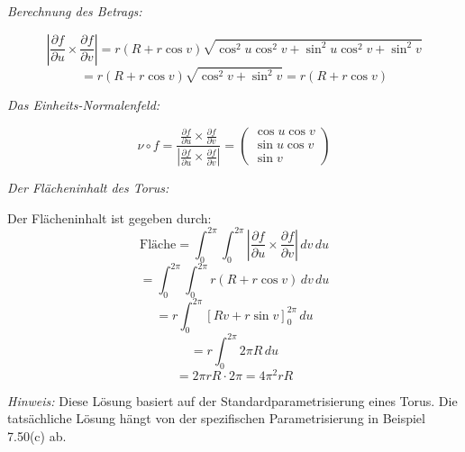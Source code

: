 \documentclass{article}
\newcommand{\del}{\partial}
\begin{document}
\textit{Berechnung des Betrags:}

$$\left|\frac{\del f}{\del u} \times \frac{\del f}{\del v}\right| = r(R + r\cos v)\sqrt{\cos^2 u \cos^2 v + \sin^2 u \cos^2 v + \sin^2 v}$$
$$= r(R + r\cos v)\sqrt{\cos^2 v + \sin^2 v} = r(R + r\cos v)$$

\textit{Das Einheits-Normalenfeld:}

$$\nu \circ f = \frac{\frac{\del f}{\del u} \times \frac{\del f}{\del v}}{\left|\frac{\del f}{\del u} \times \frac{\del f}{\del v}\right|} = \begin{pmatrix}
\cos u \cos v \\
\sin u \cos v \\
\sin v
\end{pmatrix}$$

\textit{Der Flächeninhalt des Torus:}

Der Flächeninhalt ist gegeben durch:
$$\text{Fläche} = \int_0^{2\pi} \int_0^{2\pi} \left|\frac{\del f}{\del u} \times \frac{\del f}{\del v}\right| \, dv \, du$$
$$= \int_0^{2\pi} \int_0^{2\pi} r(R + r\cos v) \, dv \, du$$
$$= r \int_0^{2\pi} \left[ Rv + r\sin v \right]_0^{2\pi} \, du$$
$$= r \int_0^{2\pi} 2\pi R \, du$$
$$= 2\pi r R \cdot 2\pi = 4\pi^2 rR$$

\textit{Hinweis:} Diese Lösung basiert auf der Standardparametrisierung eines Torus. Die tatsächliche Lösung hängt von der spezifischen Parametrisierung in Beispiel 7.50(c) ab.
\end{document}
